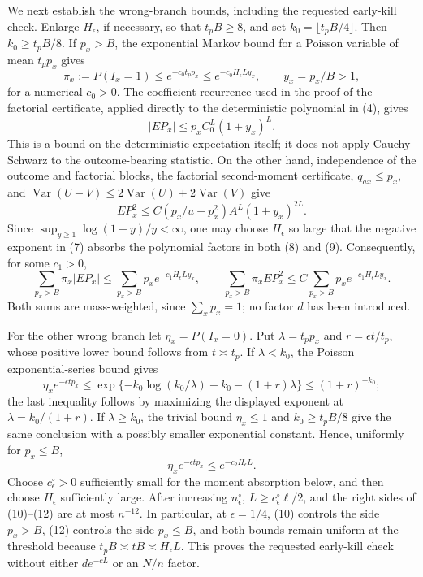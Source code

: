 We next establish the wrong-branch bounds, including the requested
early-kill check.  Enlarge \(H_\epsilon\), if necessary, so that
\(t_pB\ge8\), and set \(k_0=\lfloor t_pB/4\rfloor\).  Then
\(k_0\ge t_pB/8\).  If \(p_x>B\), the exponential Markov bound for a
Poisson variable of mean \(t_pp_x\) gives
\[
 \pi_x:=P(I_x=1)\le e^{-c_0t_pp_x}
 \le e^{-c_0H_\epsilon Ly_x},
 \qquad y_x=p_x/B>1,
 \tag{7}
\]
for a numerical \(c_0>0\).  The coefficient recurrence used in the
proof of the factorial certificate, applied directly to the
deterministic polynomial in (4), gives
\[
 |EP_x|\le p_x C_0^L(1+y_x)^L.                 \tag{8}
\]
This is a bound on the deterministic expectation itself; it does not
apply Cauchy--Schwarz to the outcome-bearing statistic.  On the other
hand, independence of the outcome and factorial blocks, the factorial
second-moment certificate, \(q_{ax}\le p_x\), and
\(\operatorname{Var}(U-V)\le2\operatorname{Var}(U)+2\operatorname{Var}(V)\)
give
\[
 EP_x^2\le C(p_x/u+p_x^2)A^L(1+y_x)^{2L}.      \tag{9}
\]
Since \(\sup_{y\ge1}\log(1+y)/y<\infty\), one may choose
\(H_\epsilon\) so large that the negative exponent in (7) absorbs the
polynomial factors in both (8) and (9).  Consequently, for some
\(c_1>0\),
\[
 \sum_{p_x>B}\pi_x|EP_x|
 \le\sum_{p_x>B}p_xe^{-c_1H_\epsilon Ly_x},
 \qquad
 \sum_{p_x>B}\pi_xEP_x^2
 \le C\sum_{p_x>B}p_xe^{-c_1H_\epsilon Ly_x}.
 \tag{10}
\]
Both sums are mass-weighted, since \(\sum_xp_x=1\); no factor \(d\)
has been introduced.

For the other wrong branch let
\(\eta_x=P(I_x=0)\).  Put \(\lambda=t_pp_x\) and
\(r=\epsilon t/t_p\), whose positive lower bound follows from
\(t\asymp t_p\).  If \(\lambda<k_0\), the Poisson exponential-series
bound gives
\[
 \eta_x e^{-\epsilon tp_x}
 \le \exp\{-k_0\log(k_0/\lambda)+k_0-(1+r)\lambda\}
 \le (1+r)^{-k_0};                              \tag{11}
\]
the last inequality follows by maximizing the displayed exponent at
\(\lambda=k_0/(1+r)\).  If \(\lambda\ge k_0\), the trivial bound
\(\eta_x\le1\) and \(k_0\ge t_pB/8\) give the same conclusion with a
possibly smaller exponential constant.  Hence, uniformly for
\(p_x\le B\),
\[
 \eta_xe^{-\epsilon tp_x}\le e^{-c_2H_\epsilon L}.                 \tag{12}
\]
Choose \(c_\epsilon^\circ>0\) sufficiently small for the moment
absorption below, and then choose \(H_\epsilon\) sufficiently large.
After increasing \(n_\epsilon^\circ\),
\(L\ge c_\epsilon^\circ\ell/2\), and the right sides of (10)--(12) are
at most \(n^{-12}\).  In particular, at \(\epsilon=1/4\), (10)
controls the side \(p_x>B\), (12) controls the side \(p_x\le B\), and
both bounds remain uniform at the threshold because
\(t_pB\asymp tB\asymp H_\epsilon L\).  This proves the requested
early-kill check without either \(d e^{-cL}\) or an \(N/n\) factor.

